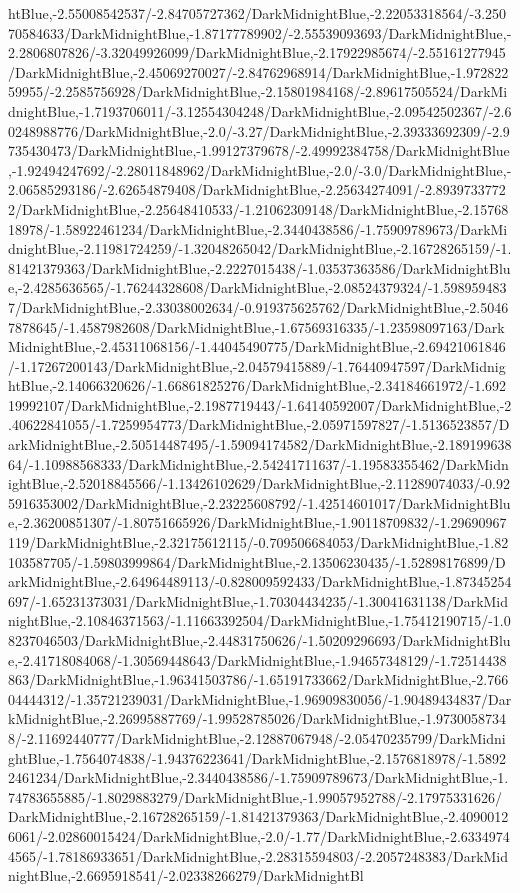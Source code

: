 {\begin{tikzternal}
{htBlue,-2.55008542537/-2.84705727362/DarkMidnightBlue,-2.22053318564/-3.25070584633/DarkMidnightBlue,-1.87177789902/-2.55539093693/DarkMidnightBlue,-2.2806807826/-3.32049926099/DarkMidnightBlue,-2.17922985674/-2.55161277945/DarkMidnightBlue,-2.45069270027/-2.84762968914/DarkMidnightBlue,-1.97282259955/-2.2585756928/DarkMidnightBlue,-2.15801984168/-2.89617505524/DarkMidnightBlue,-1.7193706011/-3.12554304248/DarkMidnightBlue,-2.09542502367/-2.60248988776/DarkMidnightBlue,-2.0/-3.27/DarkMidnightBlue,-2.39333692309/-2.9735430473/DarkMidnightBlue,-1.99127379678/-2.49992384758/DarkMidnightBlue,-1.92494247692/-2.28011848962/DarkMidnightBlue,-2.0/-3.0/DarkMidnightBlue,-2.06585293186/-2.62654879408/DarkMidnightBlue,-2.25634274091/-2.89397337722/DarkMidnightBlue,-2.25648410533/-1.21062309148/DarkMidnightBlue,-2.1576818978/-1.58922461234/DarkMidnightBlue,-2.3440438586/-1.75909789673/DarkMidnightBlue,-2.11981724259/-1.32048265042/DarkMidnightBlue,-2.16728265159/-1.81421379363/DarkMidnightBlue,-2.2227015438/-1.03537363586/DarkMidnightBlue,-2.4285636565/-1.76244328608/DarkMidnightBlue,-2.08524379324/-1.5989594837/DarkMidnightBlue,-2.33038002634/-0.919375625762/DarkMidnightBlue,-2.50467878645/-1.4587982608/DarkMidnightBlue,-1.67569316335/-1.23598097163/DarkMidnightBlue,-2.45311068156/-1.44045490775/DarkMidnightBlue,-2.69421061846/-1.17267200143/DarkMidnightBlue,-2.04579415889/-1.76440947597/DarkMidnightBlue,-2.14066320626/-1.66861825276/DarkMidnightBlue,-2.34184661972/-1.69219992107/DarkMidnightBlue,-2.1987719443/-1.64140592007/DarkMidnightBlue,-2.40622841055/-1.7259954773/DarkMidnightBlue,-2.05971597827/-1.5136523857/DarkMidnightBlue,-2.50514487495/-1.59094174582/DarkMidnightBlue,-2.18919963864/-1.10988568333/DarkMidnightBlue,-2.54241711637/-1.19583355462/DarkMidnightBlue,-2.52018845566/-1.13426102629/DarkMidnightBlue,-2.11289074033/-0.925916353002/DarkMidnightBlue,-2.23225608792/-1.42514601017/DarkMidnightBlue,-2.36200851307/-1.80751665926/DarkMidnightBlue,-1.90118709832/-1.29690967119/DarkMidnightBlue,-2.32175612115/-0.709506684053/DarkMidnightBlue,-1.82103587705/-1.59803999864/DarkMidnightBlue,-2.13506230435/-1.52898176899/DarkMidnightBlue,-2.64964489113/-0.828009592433/DarkMidnightBlue,-1.87345254697/-1.65231373031/DarkMidnightBlue,-1.70304434235/-1.30041631138/DarkMidnightBlue,-2.10846371563/-1.11663392504/DarkMidnightBlue,-1.75412190715/-1.08237046503/DarkMidnightBlue,-2.44831750626/-1.50209296693/DarkMidnightBlue,-2.41718084068/-1.30569448643/DarkMidnightBlue,-1.94657348129/-1.72514438863/DarkMidnightBlue,-1.96341503786/-1.65191733662/DarkMidnightBlue,-2.76604444312/-1.35721239031/DarkMidnightBlue,-1.96909830056/-1.90489434837/DarkMidnightBlue,-2.26995887769/-1.99528785026/DarkMidnightBlue,-1.97300587348/-2.11692440777/DarkMidnightBlue,-2.12887067948/-2.05470235799/DarkMidnightBlue,-1.7564074838/-1.94376223641/DarkMidnightBlue,-2.1576818978/-1.58922461234/DarkMidnightBlue,-2.3440438586/-1.75909789673/DarkMidnightBlue,-1.74783655885/-1.8029883279/DarkMidnightBlue,-1.99057952788/-2.17975331626/DarkMidnightBlue,-2.16728265159/-1.81421379363/DarkMidnightBlue,-2.40900126061/-2.02860015424/DarkMidnightBlue,-2.0/-1.77/DarkMidnightBlue,-2.63349744565/-1.78186933651/DarkMidnightBlue,-2.28315594803/-2.2057248383/DarkMidnightBlue,-2.6695918541/-2.02338266279/DarkMidnightBl}
\end{tikzternal}}
